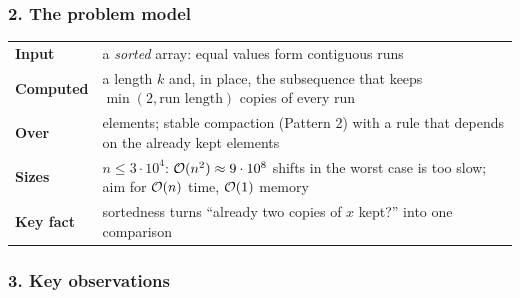 \subsubsection*{2. The problem model}
\begin{modelbox}
\renewcommand{\arraystretch}{1.35}
\begin{tabularx}{\linewidth}{@{}>{\bfseries}l X@{}}
Input & a \emph{sorted} array: equal values form contiguous runs \\
Computed & a length $k$ and, in place, the subsequence that keeps $\min(2, \text{run length})$ copies of every run \\
Over & elements; stable compaction (Pattern 2) with a rule that depends on the already kept elements \\
Sizes & $n \le 3\cdot10^4$: $\mathcal{O}(n^2) \approx 9\cdot10^8$ shifts in the worst case is too slow; aim for $\mathcal{O}(n)$ time, $\mathcal{O}(1)$ memory \\
Key fact & sortedness turns ``already two copies of $x$ kept?'' into one comparison \\
\end{tabularx}
\end{modelbox}

\begin{diagrambox}
\end{diagrambox}

\subsubsection*{3. Key observations}

